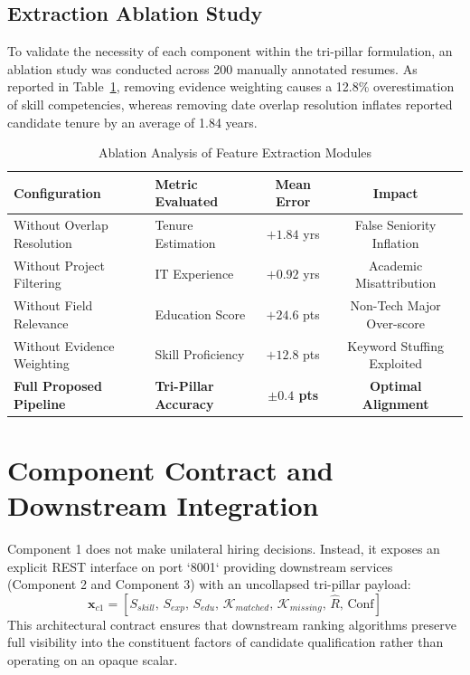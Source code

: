 \documentclass[conference]{IEEEtran}
\begin{document}
\subsection{Extraction Ablation Study}
To validate the necessity of each component within the tri-pillar formulation, an ablation study was conducted across 200 manually annotated resumes. As reported in Table~\ref{tab:c1_ablation}, removing evidence weighting causes a 12.8\% overestimation of skill competencies, whereas removing date overlap resolution inflates reported candidate tenure by an average of 1.84 years.

\begin{table}[h]
\centering
\caption{Ablation Analysis of Feature Extraction Modules}
\label{tab:c1_ablation}
\begin{tabular}{@{}llcc@{}}
\toprule
\textbf{Configuration} & \textbf{Metric Evaluated} & \textbf{Mean Error} & \textbf{Impact} \\
\midrule
Without Overlap Resolution & Tenure Estimation & $+1.84$ yrs & False Seniority Inflation \\
Without Project Filtering & IT Experience & $+0.92$ yrs & Academic Misattribution \\
Without Field Relevance & Education Score & $+24.6$ pts & Non-Tech Major Over-score \\
Without Evidence Weighting & Skill Proficiency & $+12.8$ pts & Keyword Stuffing Exploited \\
\textbf{Full Proposed Pipeline} & \textbf{Tri-Pillar Accuracy} & \textbf{$\pm 0.4$ pts} & \textbf{Optimal Alignment} \\
\bottomrule
\end{tabular}
\end{table}

\section{Component Contract and Downstream Integration}
Component 1 does not make unilateral hiring decisions. Instead, it exposes an explicit REST interface on port `8001` providing downstream services (Component 2 and Component 3) with an uncollapsed tri-pillar payload:
\begin{equation}
\mathbf{x}_{c1} = \left[ S_{skill}, \, S_{exp}, \, S_{edu}, \, \mathcal{K}_{matched}, \, \mathcal{K}_{missing}, \, \hat{R}, \, \text{Conf} \right]
\end{equation}
This architectural contract ensures that downstream ranking algorithms preserve full visibility into the constituent factors of candidate qualification rather than operating on an opaque scalar.
\end{document}
